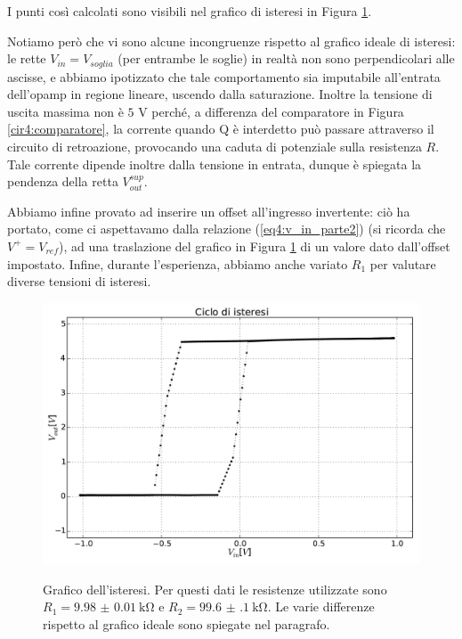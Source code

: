 I punti così calcolati sono visibili nel grafico di isteresi in Figura \ref{gr4:isteresi}.

Notiamo però che vi sono alcune incongruenze rispetto al grafico ideale di isteresi: le rette $V_{in}=V_{soglia}$ (per entrambe le soglie) in realtà non sono perpendicolari alle ascisse, e abbiamo ipotizzato che tale comportamento sia imputabile all'entrata dell'opamp in regione lineare, uscendo dalla saturazione.
Inoltre la tensione di uscita massima non è $5$ \si{\volt} perché, a differenza del comparatore in Figura \ref{cir4:comparatore}, la corrente quando Q è interdetto può passare attraverso il circuito di retroazione, provocando una caduta di potenziale sulla resistenza $R$.
Tale corrente dipende inoltre dalla tensione in entrata, dunque è spiegata la pendenza della retta $V_{out}^{sup}$.

Abbiamo infine provato ad inserire un offset all'ingresso invertente: ciò ha portato, come ci aspettavamo dalla relazione (\ref{eq4:v_in_parte2}) (si ricorda che $V^+=V_{ref}$), ad una traslazione del grafico in Figura \ref{gr4:isteresi} di un valore dato dall'offset impostato. Infine, durante l'esperienza, abbiamo anche variato $R_1$ per valutare diverse tensioni di isteresi.

\begin{figure}[ht]
 \centering
   {\includegraphics[width=14.5cm]{../E04/latex/XY.pdf}}
 \caption{Grafico dell'isteresi. Per questi dati le resistenze utilizzate sono $R_1=\SI{9.98(1)}{\kohm}$ e $R_2=\SI{99.6(1)}{\kohm}$. Le varie differenze rispetto al grafico ideale sono spiegate nel paragrafo.}
 \label{gr4:isteresi}
\end{figure}